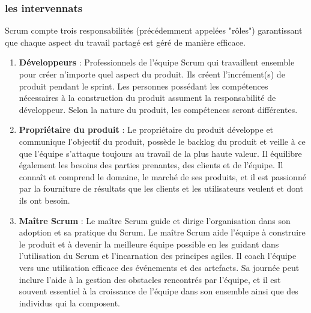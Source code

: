 \subsubsection{les intervennats}
Scrum compte trois responsabilités (précédemment appelées "rôles") garantissant que chaque aspect du travail partagé est géré de manière efficace.
\begin{enumerate}
    \item \textbf{Développeurs} : Professionnels de l'équipe Scrum qui travaillent ensemble pour créer n'importe quel aspect du produit. Ils créent l'incrément(s) de produit pendant le sprint. Les personnes possédant les compétences nécessaires à la construction du produit assument la responsabilité de développeur. Selon la nature du produit, les compétences seront différentes. 
    \item \textbf{Propriétaire du produit} : Le propriétaire du produit développe et communique l'objectif du produit, possède le backlog du produit et veille à ce que l'équipe s'attaque toujours au travail de la plus haute valeur. Il équilibre également les besoins des parties prenantes, des clients et de l'équipe. Il connaît et comprend le domaine, le marché de ses produits, et il est passionné par la fourniture de résultats que les clients et les utilisateurs veulent et dont ils ont besoin.
    \item \textbf{Maître Scrum} : Le maître Scrum guide et dirige l'organisation dans son adoption et sa pratique du Scrum. Le maître Scrum aide l'équipe à construire le produit et à devenir la meilleure équipe possible en les guidant dans l'utilisation du Scrum et l'incarnation des principes agiles. Il coach l'équipe vers une utilisation efficace des événements et des artefacts. Sa journée peut inclure l'aide à la gestion des obstacles rencontrés par l'équipe, et il est souvent essentiel à la croissance de l'équipe dans son ensemble ainsi que des individus qui la composent.
\end{enumerate}
